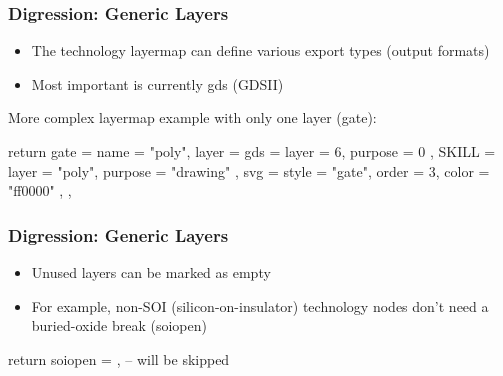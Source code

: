 \documentclass[aspectratio=169, dvipsnames, x11names, svgnames, 11pt]{beamer}
\begin{document}
\begin{frame}[fragile]
    \frametitle{Digression: Generic Layers}
    \centering
    \begin{itemize}
        \item The technology layermap can define various export types (output formats)
        \item Most important is currently gds (GDSII)
    \end{itemize}
    \vfill
    More complex layermap example with only one layer (gate):
    \begin{luacode}
        return {
            gate = {
                name = "poly",
                layer = {
                    gds = { layer = 6, purpose = 0 },
                    SKILL = { layer = "poly", purpose = "drawing" },
                    svg = { style = "gate", order = 3, color = "ff0000" },
                }
            },
        }
    \end{luacode}
\end{frame}

\begin{frame}[fragile]
    \frametitle{Digression: Generic Layers}
    \centering
    \begin{itemize}
        \item Unused layers can be marked as empty
        \item For example, non-SOI (silicon-on-insulator) technology nodes don't need a buried-oxide break (soiopen)
    \end{itemize}
    \vfill
    \begin{luacode}
        return {
            soiopen = {}, -- will be skipped
        }
    \end{luacode}
\end{frame}
\end{document}
